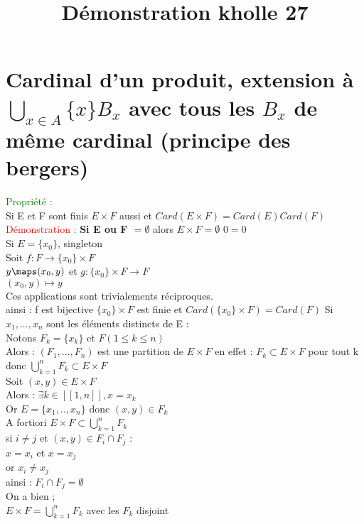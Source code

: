 \documentclass{article}
\begin{document}
\title{Démonstration kholle 27}
\date{}
\maketitle
\renewcommand{\thesection}{\Roman{section}}
\setlength{\parindent}{1.5cm}
\section{Cardinal d'un produit, extension à $\bigcup_{x\in A} \lbrace x \rbrace B_x$ avec tous les $B_x$ de  même cardinal (principe des bergers)}
\textcolor{green}{Propriété :} \\
Si E et F sont finis $E \times F $ aussi et $Card(E \times F)= Card(E) Card(F)$ \\
\textcolor{red}{Démonstration :}
{\bf \boldmath Si E ou F $= \emptyset$} alors $E \times F= \emptyset$ $0=0$ \\
Si $E= \lbrace x_0 \rbrace$, singleton \\
Soit $f: F \rightarrow \lbrace x_0 \rbrace \times F $ \\
$y \maps (x_0,y)$
et $g : \lbrace x_0 \rbrace \times F \rightarrow F$ \\
$(x_0,y) \mapsto y$ \\
Ces applications sont trivialements réciproques. \\
ainsi : f est bijective $\lbrace x_0 \rbrace \times F$ est finie et $Card(\lbrace x_0 \rbrace \times F)= Card(F) $
Si $x_1,..., x_n$ sont les éléments distincts de E : \\
Notons $F_k= \lbrace x_k \rbrace $ et $F(1 \leq k \leq n)$ \\
Alors : $(F_1,...,F_n)$ est une partition de $E \times F$
en effet :
$F_k \subset E \times F$ pour tout k donc $\bigcup_{k=1}^n F_k \subset E \times F$ \\
Soit $(x,y) \in E \times F$ \\
Alors : $\exists k \in [[1,n]],x=x_k$ \\
Or $E= \lbrace x_1,..,x_n \rbrace $ donc $(x,y) \in F_k$ \\
A fortiori  $E \times F \subset \bigcup_{k=1}^n F_k$ \\
si $i \neq j$ et $(x,y) \in F_i \cap F_j$ : \\
$x=x_i$ et $x=x_j$ \\
or $x_i\neq x_j $ \\
ainsi : $F_i \cap F_j = \emptyset $ \\
On a bien ; \\
$E \times F= \bigcup_{k=1}^n F_k$  avec les $F_k$ disjoint \\
\end{document}
